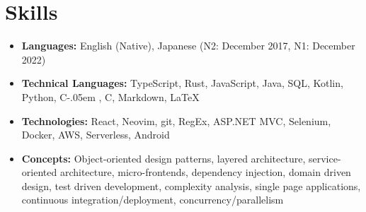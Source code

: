 \documentclass[letterpaper,11pt]{article}
\newcommand{\resumeItem}[2]{
    \vspace{-2pt}
    \item\small{
        \textbf{#1}{ #2 \vspace{-2pt}}
    }
}
\newcommand{\resumeSubItem}[2]{\resumeItem{#1}{#2}}
\def\Cplusplus{C\raisebox{0.5ex}{\tiny\textbf{++}}}
\newcommand{\Csharp}{%
  {\settoheight{\dimen0}{C}C\kern-.05em \resizebox{!}{\dimen0}{\raisebox{\depth}{\#}}}}
\begin{document}
\section{\textbf{Skills}}
\begin{itemize}
    \resumeSubItem{\textbf{Languages:}}
        {
            English (Native),
            Japanese (N2: December 2017, N1: December 2022)
        }
    \resumeSubItem{\textbf{Technical Languages:}}
        {
            TypeScript,
            Rust,
            JavaScript,
            Java,
            SQL,
            Kotlin,
            Python,
            \Csharp,
            \Cplusplus,
            Markdown,
            \LaTeX
        }
    \resumeSubItem{\textbf{Technologies:}}
        {
            React,
            Neovim,
            git,
            RegEx,
            ASP.NET MVC,
            Selenium,
            Docker,
            AWS,
            Serverless,
            Android
        }
    \resumeSubItem{\textbf{Concepts:}}
        {
            Object-oriented design patterns,
            layered architecture,
            service-oriented architecture,
            micro-frontends,
            dependency injection,
            domain driven design,
            test driven development,
            complexity analysis,
            single page applications,
            continuous integration/deployment,
            concurrency/parallelism
        }
 \end{itemize}

\end{document}

